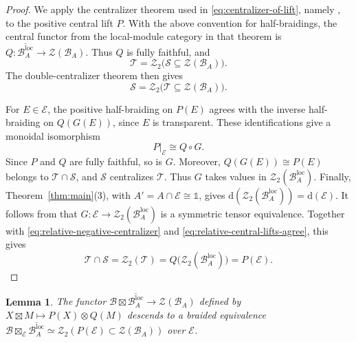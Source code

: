 \documentclass[11pt,reqno]{amsart}
\numberwithin{equation}{section}
\theoremstyle{plain}
\newtheorem{lemma}[thmctr]{Lemma}
\theoremstyle{definition}
\theoremstyle{remark}
\newcommand{\unit}{\mathds{1}}
\newcommand{\B}{\mathcal{B}}
\newcommand{\E}{\mathcal{E}}
\newcommand{\Z}{\mathcal{Z}}
\newcommand{\T}{\mathcal{T}}
\newcommand{\cS}{\mathcal{S}}
\newcommand{\loc}{\mathrm{loc}}
\newcommand{\FP}{\mathrm{d}}
\begin{document}
\begin{proof}
We apply the centralizer theorem used in \eqref{eq:centralizer-of-lift}, namely
\cite[Theorem~5.13]{shimizu2026commutative}, to the positive central lift
$P$. With the above convention for half-braidings, the central functor from
the local-module category in that theorem is
$Q:\overline{\B_A^\loc}\to\Z(\B_A)$. Thus $Q$ is fully faithful, and
\begin{equation}\label{eq:relative-positive-centralizer}
  \T = \Z_2\bigl(\cS\subseteq\Z(\B_A)\bigr).
\end{equation}
The double-centralizer theorem \cite[Theorem~4.9]{shimizu2019non} then gives
\begin{equation}\label{eq:relative-negative-centralizer}
  \cS
  =
  \Z_2\bigl(\T\subseteq\Z(\B_A)\bigr).
\end{equation}

For $E\in\E$, the positive half-braiding on $P(E)$ agrees with the inverse
half-braiding on $Q(G(E))$, since $E$ is transparent. These identifications
give a monoidal isomorphism
\begin{equation}\label{eq:relative-central-lifts-agree}
  P|_{\E}\cong Q\circ G.
\end{equation}
Since $P$ and $Q$ are fully faithful, so is $G$. Moreover,
$Q(G(E))\cong P(E)$ belongs to $\T\cap\cS$, and $\cS$ centralizes $\T$.
Thus $G$ takes values in $\Z_2(\B_A^\loc)$. Finally,
Theorem~\ref{thm:main}(3), with $A'=A\cap\E\cong\unit$, gives
$\FP(\Z_2(\B_A^\loc))=\FP(\E)$. It follows from
\cite[Proposition~6.3.3]{etingof2016tensor} that
$G:\E\to\Z_2(\B_A^\loc)$ is a symmetric tensor equivalence.
Together with \eqref{eq:relative-negative-centralizer} and
\eqref{eq:relative-central-lifts-agree}, this gives
\begin{equation}\label{eq:relative-centralizer-intersection}
  \T\cap\cS = \Z_2(\T) =  Q\bigl(\Z_2(\B_A^\loc)\bigr) = P(\E).
\end{equation}
\end{proof}

\begin{lemma}\label{lem:relative-center-factorization}
The functor $\B\boxtimes\overline{\B_A^\loc}\to\Z(\B_A)$ defined by
$X\boxtimes M\mapsto P(X)\otimes Q(M)$ descends to a braided equivalence
$\B\boxtimes_{\E}\overline{\B_A^\loc}\simeq\Z_2(P(\E)\subset \Z(\B_A))$ over $\E$.
\end{lemma}
\end{document}
